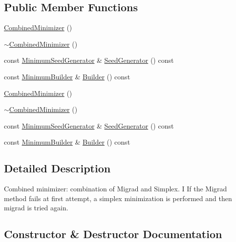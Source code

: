 \subsection*{Public Member Functions}
\begin{DoxyCompactItemize}
\item 
\mbox{\hyperlink{classROOT_1_1Minuit2_1_1CombinedMinimizer_a9e94be9d301a4db910252f4856c34801}{Combined\+Minimizer}} ()
\item 
\mbox{\hyperlink{classROOT_1_1Minuit2_1_1CombinedMinimizer_a09de1afbff4418ffaf7b94e625243cd1}{$\sim$\+Combined\+Minimizer}} ()
\item 
const \mbox{\hyperlink{classROOT_1_1Minuit2_1_1MinimumSeedGenerator}{Minimum\+Seed\+Generator}} \& \mbox{\hyperlink{classROOT_1_1Minuit2_1_1CombinedMinimizer_a667ce6c321b6948d37087a2ac06be58c}{Seed\+Generator}} () const
\item 
const \mbox{\hyperlink{classROOT_1_1Minuit2_1_1MinimumBuilder}{Minimum\+Builder}} \& \mbox{\hyperlink{classROOT_1_1Minuit2_1_1CombinedMinimizer_a73befc9c0bdfe8c9f09638505772c5ed}{Builder}} () const
\item 
\mbox{\hyperlink{classROOT_1_1Minuit2_1_1CombinedMinimizer_a9e94be9d301a4db910252f4856c34801}{Combined\+Minimizer}} ()
\item 
\mbox{\hyperlink{classROOT_1_1Minuit2_1_1CombinedMinimizer_a09de1afbff4418ffaf7b94e625243cd1}{$\sim$\+Combined\+Minimizer}} ()
\item 
const \mbox{\hyperlink{classROOT_1_1Minuit2_1_1MinimumSeedGenerator}{Minimum\+Seed\+Generator}} \& \mbox{\hyperlink{classROOT_1_1Minuit2_1_1CombinedMinimizer_a667ce6c321b6948d37087a2ac06be58c}{Seed\+Generator}} () const
\item 
const \mbox{\hyperlink{classROOT_1_1Minuit2_1_1MinimumBuilder}{Minimum\+Builder}} \& \mbox{\hyperlink{classROOT_1_1Minuit2_1_1CombinedMinimizer_a73befc9c0bdfe8c9f09638505772c5ed}{Builder}} () const
\end{DoxyCompactItemize}


\subsection{Detailed Description}
Combined minimizer\+: combination of Migrad and Simplex. I If the Migrad method fails at first attempt, a simplex minimization is performed and then migrad is tried again. 

\subsection{Constructor \& Destructor Documentation}
\mbox{\label{classROOT_1_1Minuit2_1_1CombinedMinimizer_a9e94be9d301a4db910252f4856c34801}} 

